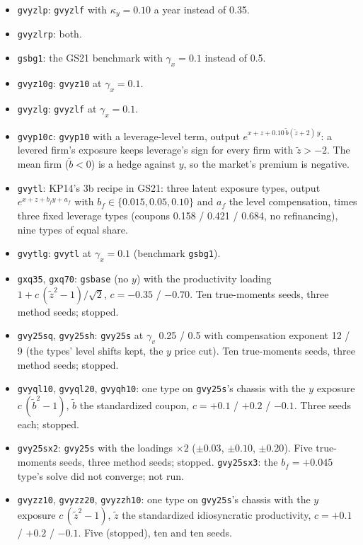 \documentclass[11pt]{article}
\begin{document}
\begin{itemize}
\item \texttt{gvyzlp}: \texttt{gvyzlf} with $\kappa_y=0.10$ a year instead of 0.35.
\item \texttt{gvyzlrp}: both.
\item \texttt{gsbg1}: the GS21 benchmark with $\gamma_x=0.1$ instead of 0.5.
\item \texttt{gvyz10g}: \texttt{gvyz10} at $\gamma_x=0.1$.
\item \texttt{gvyzlg}: \texttt{gvyzlf} at $\gamma_x=0.1$.
\item \texttt{gvyp10c}: \texttt{gvyp10} with a leverage-level term, output $e^{x+z+0.10\,\tilde b(\tilde z+2)\,y}$: a levered firm's exposure keeps leverage's sign for every firm with $\tilde z>-2$. The mean firm ($\tilde b<0$) is a hedge against $y$, so the market's premium is negative.
\item \texttt{gvytl}: KP14's 3b recipe in GS21: three latent exposure types, output $e^{x+z+b_f y+a_f}$ with $b_f\in\{0.015,0.05,0.10\}$ and $a_f$ the level compensation, times three fixed leverage types (coupons 0.158 / 0.421 / 0.684, no refinancing), nine types of equal share.
\item \texttt{gvytlg}: \texttt{gvytl} at $\gamma_x=0.1$ (benchmark \texttt{gsbg1}).
\item \texttt{gxq35}, \texttt{gxq70}: \texttt{gsbase} (no $y$) with the productivity loading $1 + c\,(\tilde z^2-1)/\sqrt2$, $c=-0.35$ / $-0.70$. Ten true-moments seeds, three method seeds; stopped.
\item \texttt{gvy25sq}, \texttt{gvy25sh}: \texttt{gvy25s} at $\gamma_v$ 0.25 / 0.5 with compensation exponent 12 / 9 (the types' level shifts kept, the $y$ price cut). Ten true-moments seeds, three method seeds; stopped.
\item \texttt{gvyql10}, \texttt{gvyql20}, \texttt{gvyqh10}: one type on \texttt{gvy25s}'s chassis with the $y$ exposure $c\,(\tilde b^2-1)$, $\tilde b$ the standardized coupon, $c=+0.1$ / $+0.2$ / $-0.1$. Three seeds each; stopped.
\item \texttt{gvy25sx2}: \texttt{gvy25s} with the loadings $\times2$ ($\pm0.03$, $\pm0.10$, $\pm0.20$). Five true-moments seeds, three method seeds; stopped. \texttt{gvy25sx3}: the $b_f=+0.045$ type's solve did not converge; not run.
\item \texttt{gvyzz10}, \texttt{gvyzz20}, \texttt{gvyzzh10}: one type on \texttt{gvy25s}'s chassis with the $y$ exposure $c\,(\tilde z^2-1)$, $\tilde z$ the standardized idiosyncratic productivity, $c=+0.1$ / $+0.2$ / $-0.1$. Five (stopped), ten and ten seeds.

\end{itemize}
\end{document}
